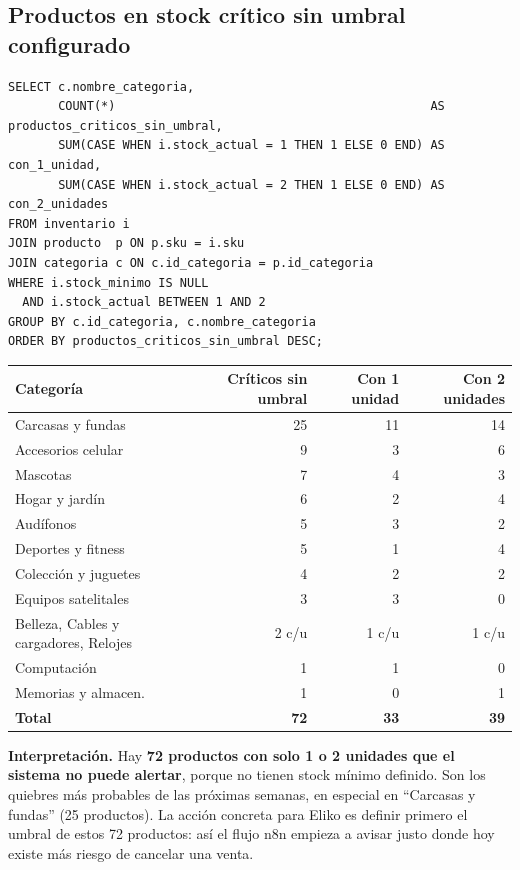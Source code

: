 \documentclass[11pt,letterpaper]{article}
\renewcommand{\_}{\oldus\allowbreak}
\begin{document}
\subsection{Productos en stock crítico sin umbral configurado}
\begin{lstlisting}[caption={Consulta 5: stock crítico sin umbral, por categoría.}]
SELECT c.nombre_categoria,
       COUNT(*)                                            AS productos_criticos_sin_umbral,
       SUM(CASE WHEN i.stock_actual = 1 THEN 1 ELSE 0 END) AS con_1_unidad,
       SUM(CASE WHEN i.stock_actual = 2 THEN 1 ELSE 0 END) AS con_2_unidades
FROM inventario i
JOIN producto  p ON p.sku = i.sku
JOIN categoria c ON c.id_categoria = p.id_categoria
WHERE i.stock_minimo IS NULL
  AND i.stock_actual BETWEEN 1 AND 2
GROUP BY c.id_categoria, c.nombre_categoria
ORDER BY productos_criticos_sin_umbral DESC;
\end{lstlisting}

\begin{center}
\small
\begin{minipage}{\textwidth}\centering
{}
\begin{tabular}{lrrr}
\toprule
\textbf{Categoría} & \textbf{Críticos sin umbral} & \textbf{Con 1 unidad} & \textbf{Con 2 unidades} \\
\midrule
Carcasas y fundas & 25 & 11 & 14 \\
Accesorios celular & 9 & 3 & 6 \\
Mascotas & 7 & 4 & 3 \\
Hogar y jardín & 6 & 2 & 4 \\
Audífonos & 5 & 3 & 2 \\
Deportes y fitness & 5 & 1 & 4 \\
Colección y juguetes & 4 & 2 & 2 \\
Equipos satelitales & 3 & 3 & 0 \\
Belleza, Cables y cargadores, Relojes & 2 c/u & 1 c/u & 1 c/u \\
Computación & 1 & 1 & 0 \\
Memorias y almacen. & 1 & 0 & 1 \\
\midrule
\textbf{Total} & \textbf{72} & \textbf{33} & \textbf{39} \\
\bottomrule
\end{tabular}
\end{minipage}
\end{center}

\textbf{Interpretación.} Hay \textbf{72 productos con solo 1 o 2 unidades que el sistema no puede alertar}, porque no tienen stock mínimo definido. Son los quiebres más probables de las próximas semanas, en especial en “Carcasas y fundas” (25 productos). La acción concreta para Eliko es definir primero el umbral de estos 72 productos: así el flujo n8n empieza a avisar justo donde hoy existe más riesgo de cancelar una venta.
\end{document}
